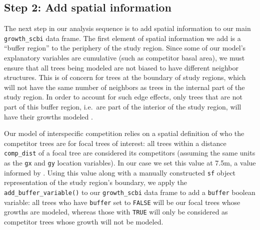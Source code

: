 \documentclass[12pt]{article}
\newenvironment{Shaded}{\begin{snugshade}}{\end{snugshade}}
\newcommand{\CommentTok}[1]{\textcolor[rgb]{0.56,0.35,0.01}{\textit{#1}}}
\newcommand{\DataTypeTok}[1]{\textcolor[rgb]{0.13,0.29,0.53}{#1}}
\newcommand{\DecValTok}[1]{\textcolor[rgb]{0.00,0.00,0.81}{#1}}
\newcommand{\FloatTok}[1]{\textcolor[rgb]{0.00,0.00,0.81}{#1}}
\newcommand{\KeywordTok}[1]{\textcolor[rgb]{0.13,0.29,0.53}{\textbf{#1}}}
\newcommand{\NormalTok}[1]{#1}
\newcommand{\OperatorTok}[1]{\textcolor[rgb]{0.81,0.36,0.00}{\textbf{#1}}}
\newcommand{\StringTok}[1]{\textcolor[rgb]{0.31,0.60,0.02}{#1}}
\begin{document}
\hypertarget{spatial-information}{%
\subsection{Step 2: Add spatial information}\label{spatial-information}}

The next step in our analysis sequence is to add spatial information to
our main \texttt{growth\_scbi} data frame. The first element of spatial
information we add is a ``buffer region'' to the periphery of the study
region. Since some of our model's explanatory variables are cumulative
(such as competitor basal area), we must ensure that all trees being
modeled are not biased to have different neighbor structures. This is of
concern for trees at the boundary of study regions, which will not have
the same number of neighbors as trees in the internal part of the study
region. In order to account for such edge effects, only trees that are
not part of this buffer region, i.e.~are part of the interior of the
study region, will have their growths modeled
\citet{waller_applied_2004}.

Our model of interspecific competition relies on a spatial definition of
who the competitor trees are for focal trees of interest: all trees
within a distance \texttt{comp\_dist} of a focal tree are considered its
competitors (assuming the same units as the \texttt{gx} and \texttt{gy}
location variables). In our case we set this value at 7.5m, a value
informed by \citet{canham_neighborhood_2004}
\citet{uriarte_spatially_2004} \citet{canham_neighborhood_2006}. Using
this value along with a manually constructed \texttt{sf} object
representation of the study region's boundary, we apply the
\texttt{add\_buffer\_variable()} to our \texttt{growth\_scbi} data frame
to add a \texttt{buffer} boolean variable: all trees who have
\texttt{buffer} set to \texttt{FALSE} will be our focal trees whose
growths are modeled, whereas those with \texttt{TRUE} will only be
considered as competitor trees whose growth will not be modeled.

\begin{Shaded}
\end{Shaded}
\end{document}
